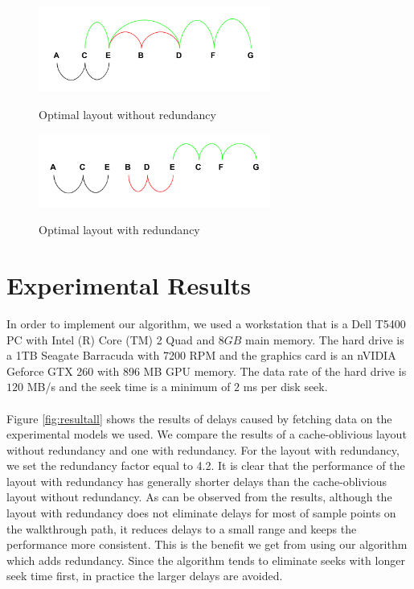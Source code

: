 \documentclass[conference]{acmsiggraph}
\begin{document}
\begin{figure}[ht]
\centering
\includegraphics[width=3in]{examplePic_woRedundancy.png}
\label{woRedundacy}
\caption{Optimal layout without redundancy}
\end{figure}

\begin{figure}[ht]
\centering
\includegraphics[width=3in]{examplePic_withRedundancy.png}
\label{withRedundancy}
\caption{Optimal layout with redundancy}
\end{figure} 

\section{Experimental Results}

In order to implement our algorithm, we used a workstation that is a Dell T5400 PC with Intel (R) Core (TM) 2 Quad and $8GB$ main memory. The hard drive is a 1TB Seagate Barracuda with 7200 RPM and the graphics card is an nVIDIA Geforce GTX 260 with 896 MB GPU memory. The data rate of the hard drive is $120$ MB/s and the seek time is a minimum of $2$ ms per disk seek.\\
\\
Figure \ref{fig:resultall} shows the results of delays caused by fetching data on the experimental models we used. We compare the results of a cache-oblivious layout without redundancy and one with redundancy. For the layout with redundancy, we set the redundancy factor equal to 4.2. It is clear that the performance of the layout with redundancy has generally shorter delays than the cache-oblivious layout without redundancy. As can be observed from the results, although the layout with redundancy does not eliminate delays for most of sample points on the walkthrough path, it reduces delays to a small range and keeps the performance more consistent. This is the benefit we get from using our algorithm which adds redundancy. Since the algorithm tends to eliminate seeks with longer seek time first, in practice the larger delays are avoided.\\
\\
\end{document}
